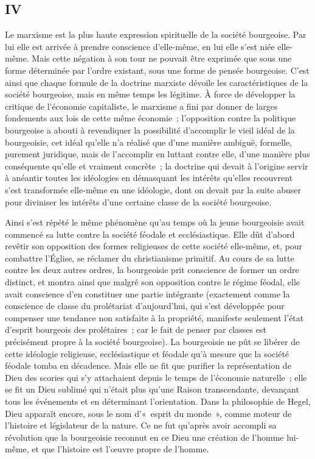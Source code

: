 \documentclass[french,twoside]{book} %
\begin{document}
\subsection[IV]{IV}
\noindent Le marxisme est la plus haute expression spirituelle de la société bourgeoise. Par lui elle est arrivée à prendre conscience d'elle-même, en lui elle s'est niée elle-même. Mais cette négation à son tour ne pouvait être exprimée que sous une forme déterminée par l'ordre existant, sous une forme de pensée bourgeoise. C'est ainsi que chaque formule de la doctrine marxiste dévoile les caractéristiques de la société bourgeoise, mais en même temps les légitime. À force de développer la critique de l'économie capitaliste, le marxisme a fini par donner de larges fondements aux lois de cette même économie ; l'opposition contre la politique bourgeoise a abouti à revendiquer la possibilité d'accomplir le vieil idéal de la bourgeoisie, cet idéal qu'elle n'a réalisé que d'une manière ambiguë, formelle, purement juridique, mais de l'accomplir en luttant contre elle, d'une manière plus conséquente qu'elle et vraiment concrète ; la doctrine qui devait à l'origine servir à anéantir toutes les idéologies en démasquant les intérêts qu'elles recouvrent s'est transformée elle-même en une idéologie, dont on devait par la suite abuser pour diviniser les intérêts d'une certaine classe de la société bourgeoise.\par
Ainsi s'est répété le même phénomène qu'au temps où la jeune bourgeoisie avait commencé sa lutte contre la société féodale et ecclésiastique. Elle dût d'abord revêtir son opposition des formes religieuses de cette société elle-même, et, pour combattre l'Église, se réclamer du christianisme primitif. Au cours de sa lutte contre les deux autres ordres, la bourgeoisie prit conscience de former un ordre distinct, et montra ainsi que malgré son opposition contre le régime féodal, elle avait conscience d'en constituer une partie intégrante (exactement comme la conscience de classe du prolétariat d'aujourd'hui, qui s'est développée pour compenser une tendance non satisfaite à la propriété, manifeste seulement l'état d'esprit bourgeois des prolétaires ; car le fait de penser par classes est précisément propre à la société bourgeoise). La bourgeoisie ne pût se libérer de cette idéologie religieuse, ecclésiastique et féodale qu'à mesure que la société féodale tomba en décadence. Mais elle ne fit que purifier la représentation de Dieu des scories qui s'y attachaient depuis le temps de l'économie naturelle ; elle se fit un Dieu sublimé qui n'était plus qu'une Raison transcendante, devançant tous les événements et en déterminant l'orientation. Dans la philosophie de Hegel, Dieu apparaît encore, sous le nom d’« esprit du monde », comme moteur de l'histoire et législateur de la nature. Ce ne fut qu'après avoir accompli sa révolution que la bourgeoisie reconnut en ce Dieu une création de l'homme lui-même, et que l'histoire est l'œuvre propre de l'homme.\par
\end{document}
